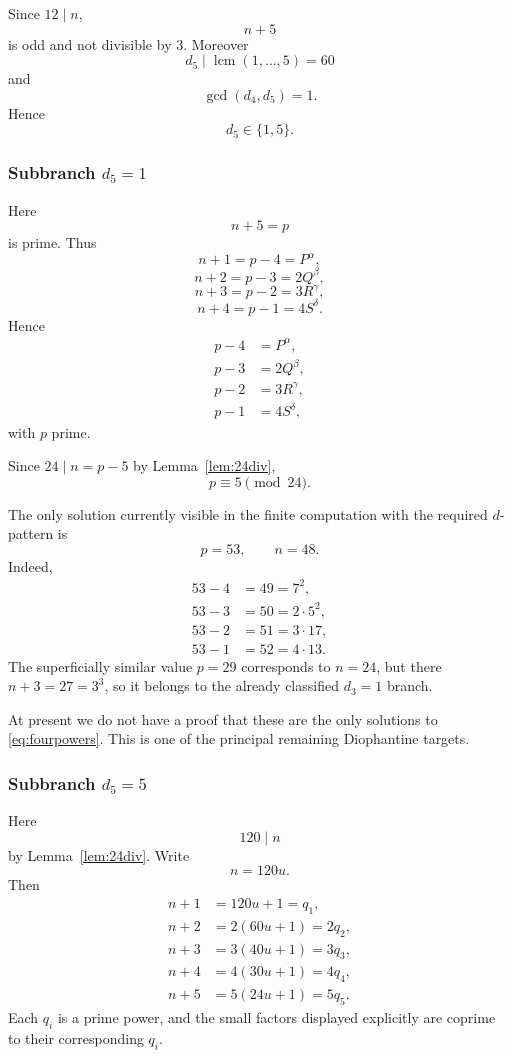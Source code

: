 \documentclass[11pt]{article}
\begin{document}
Since \(12\mid n\),
\[
n+5
\]
is odd and not divisible by \(3\).  Moreover
\[
d_5\mid\operatorname{lcm}(1,\ldots,5)=60
\]
and
\[
\gcd(d_4,d_5)=1.
\]
Hence
\[
\boxed{d_5\in\{1,5\}.}
\tag{31}
\]

\subsubsection{Subbranch \(d_5=1\)}

Here
\[
n+5=p
\]
is prime.  Thus
\[
n+1=p-4=P^\alpha,
\]
\[
n+2=p-3=2Q^\beta,
\]
\[
n+3=p-2=3R^\gamma,
\]
\[
n+4=p-1=4S^\delta.
\]
Hence
\[
\boxed{
\begin{aligned}
p-4&=P^\alpha,\\
p-3&=2Q^\beta,\\
p-2&=3R^\gamma,\\
p-1&=4S^\delta,
\end{aligned}
}
\tag{32}\label{eq:fourpowers}
\]
with \(p\) prime.

Since \(24\mid n=p-5\) by Lemma~\ref{lem:24div},
\[
\boxed{p\equiv5\pmod{24}.}
\tag{33}
\]

The only solution currently visible in the finite computation with the
required $d$-pattern is
\[
p=53,
\qquad n=48.
\]
Indeed,
\[
\begin{aligned}
53-4&=49=7^2,\\
53-3&=50=2\cdot5^2,\\
53-2&=51=3\cdot17,\\
53-1&=52=4\cdot13.
\end{aligned}
\]
The superficially similar value $p=29$ corresponds to $n=24$, but there
$n+3=27=3^3$, so it belongs to the already classified $d_3=1$ branch.

At present we do not have a proof that these are the only solutions to
\eqref{eq:fourpowers}.  This is one of the principal remaining Diophantine targets.

\subsubsection{Subbranch \(d_5=5\)}

Here
\[
\boxed{120\mid n}
\]
by Lemma~\ref{lem:24div}.  Write
\[
n=120u.
\]
Then
\[
\begin{aligned}
n+1&=120u+1=q_1,\\
n+2&=2(60u+1)=2q_2,\\
n+3&=3(40u+1)=3q_3,\\
n+4&=4(30u+1)=4q_4,\\
n+5&=5(24u+1)=5q_5.
\end{aligned}
\tag{34a}\label{eq:qblock120}
\]
Each $q_i$ is a prime power, and the small factors displayed explicitly are
coprime to their corresponding $q_i$.
\end{document}
